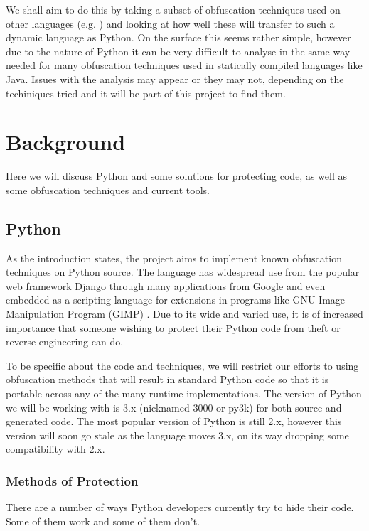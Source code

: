 \documentclass{report}
\begin{document}
We shall aim to do this by taking a subset of obfuscation techniques used on other languages (e.g.
\cite{taxobftrans}) and looking at how well these will transfer to such a dynamic language as Python. On the
surface this seems rather simple, however due to the nature of Python it can be very difficult to analyse
\cite[p13]{staticanal} in the same way needed for many obfuscation techniques used in statically compiled
languages like Java. Issues with the analysis may appear or they may not, depending on the techiniques
tried and it will be part of this project to find them.

\section{Background}

Here we will discuss Python and some solutions for protecting code, as well as some obfuscation techniques
and current tools.

\subsection{Python}

As the introduction states, the project aims to implement known obfuscation techniques on Python source.
The language has widespread use from the popular web framework Django \cite{django} through many applications
from Google \cite{pygoogle} and even embedded as a scripting language for extensions in programs like GNU
Image Manipulation Program (GIMP) \cite{gimp}. Due to its wide and varied use, it is of increased importance
that someone wishing to protect their Python code from theft or reverse-engineering can do.

To be specific about the code and techniques, we will restrict our efforts to using obfuscation methods that will
result in standard Python code so that it is portable across any of the many runtime implementations. The version
of Python we will be working with is 3.x (nicknamed 3000 or py3k) for both source and generated code. The most popular
version of Python is still 2.x, however this version will soon go stale as the language moves 3.x, on its way
dropping some compatibility with 2.x.

\subsubsection{Methods of Protection}

There are a number of ways Python developers currently try to hide their code. Some of them work and some of
them don't.
\end{document}
